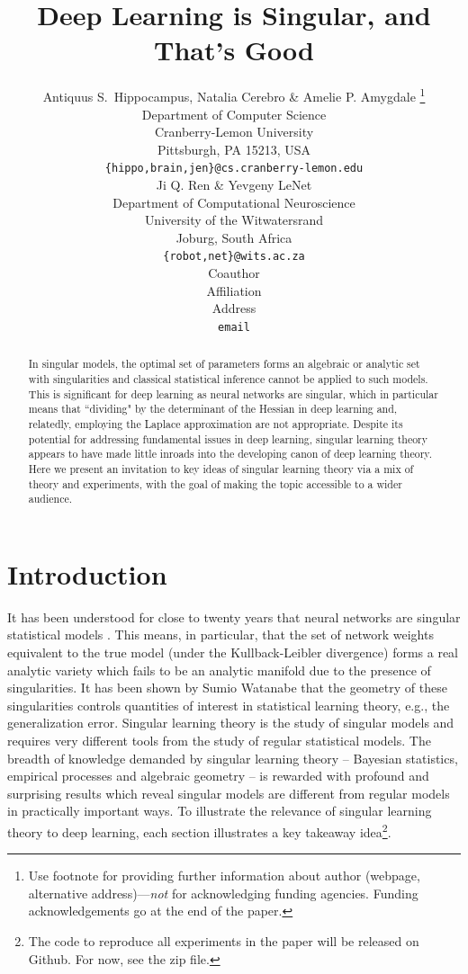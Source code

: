 \documentclass{article} %
\title{Deep Learning is Singular, and That's Good}
\author{Antiquus S.~Hippocampus, Natalia Cerebro \& Amelie P. Amygdale \thanks{ Use footnote for providing further information
about author (webpage, alternative address)---\emph{not} for acknowledging
funding agencies.  Funding acknowledgements go at the end of the paper.} \\
Department of Computer Science\\
Cranberry-Lemon University\\
Pittsburgh, PA 15213, USA \\
\texttt{\{hippo,brain,jen\}@cs.cranberry-lemon.edu} \\
\And
Ji Q. Ren \& Yevgeny LeNet \\
Department of Computational Neuroscience \\
University of the Witwatersrand \\
Joburg, South Africa \\
\texttt{\{robot,net\}@wits.ac.za} \\
\AND
Coauthor \\
Affiliation \\
Address \\
\texttt{email}
}
\begin{document}
\maketitle

\begin{abstract}
In singular models, the optimal set of parameters forms an algebraic or analytic set with singularities and classical statistical inference cannot be applied to such models. This is significant for deep learning as neural networks are singular, which in particular means that ``dividing" by the determinant of the Hessian in deep learning and, relatedly, employing the Laplace approximation are not appropriate. Despite its potential for addressing fundamental issues in deep learning, singular learning theory appears to have made little inroads into the developing canon of deep learning theory. Here we present an invitation to key ideas of singular learning theory via a mix of theory and experiments, with the goal of making the topic accessible to a wider audience. 
\end{abstract}

\section{Introduction}

It has been understood for close to twenty years that neural networks are singular statistical models \cite{amari_learning_2003, watanabe_almost_2007}. This means, in particular, that the set of network weights equivalent to the true model (under the Kullback-Leibler divergence) forms a real analytic variety which fails to be an analytic manifold due to the presence of singularities. It has been shown by Sumio Watanabe that the geometry of these singularities controls quantities of interest in statistical learning theory, e.g., the generalization error. Singular learning theory \citep{watanabe_algebraic_2009} is the study of singular models and requires very different tools from the study of regular statistical models. The breadth of knowledge demanded by singular learning theory -- Bayesian statistics, empirical processes and algebraic geometry -- is rewarded with profound and surprising results which reveal singular models are different from regular models in practically important ways.
To illustrate the relevance of singular learning theory to deep learning, each section illustrates a key takeaway idea\footnote{The code to reproduce all experiments in the paper will be released on Github. For now, see the zip file.}. 
\end{document}
